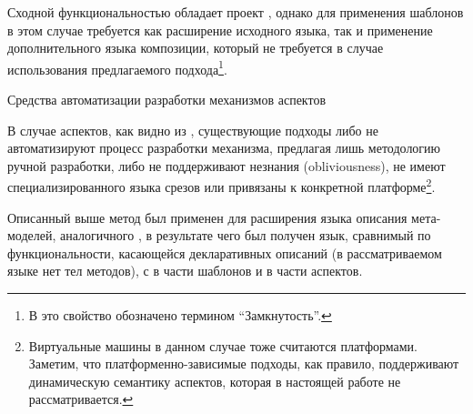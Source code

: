 Сходной функциональностью обладает проект , однако для применения шаблонов в этом случае требуется как расширение исходного языка, так и применение дополнительного языка композиции, который не требуется в случае использования предлагаемого подхода\footnote{В  это свойство обозначено термином ``Замкнутость''.}.

\begin{table}[htb]
	\centering
\newcommand{\dissonly}[1]{}

	\caption{Средства автоматизации разработки механизмов аспектов}\label{AspTable}
\end{table}

В случае аспектов, как видно из , существующие подходы либо не автоматизируют процесс разработки механизма, предлагая лишь методологию ручной разработки, либо не поддерживают незнания (obliviousness), не имеют специализированного языка срезов или привязаны к конкретной платформе\footnote{ Виртуальные машины в данном случае тоже считаются платформами. Заметим, что платформенно-зависимые подходы, как правило, поддерживают динамическую семантику аспектов, которая в настоящей работе не рассматривается.}. 

Описанный выше метод был применен для расширения языка описания мета-моделей, аналогичного , в результате чего был получен язык, сравнимый по функциональности, касающейся декларативных описаний (в рассматриваемом языке нет тел методов), с  в части шаблонов и  в части аспектов.
